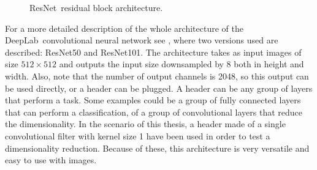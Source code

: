 \begin{figure}[h]
  \centering
  \caption{ResNet~\resnet residual block architecture. }
  \label{fig:resnet_block}
\end{figure}

For a more detailed description of the whole architecture of the DeepLab~\deeplab convolutional neural network see , where two versions used are described: ResNet50 and ResNet101.
The architecture takes as input images of size $512 \times 512$ and outputs the input size downsampled by $8$ both in height and width.
Also, note that the number of output channels is 2048, so this output can be used directly, or a header can be plugged.
A header can be any group of layers that perform a task. Some examples could be a group of fully connected layers that can perform a classification, of a group of convolutional layers that reduce the dimensionality.
In the scenario of this thesis, a header made of a single convolutional filter with kernel size 1 have been used in order to test a dimensionality reduction.
Because of these, this architecture is very versatile and easy to use with images.

